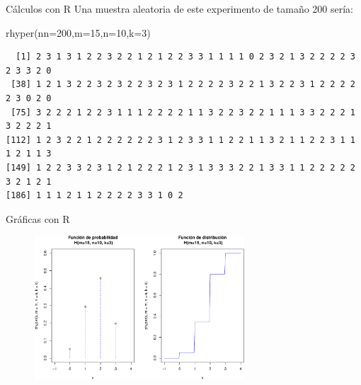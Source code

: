 \documentclass[
  ignorenonframetext,
  aspectratio=169]{beamer}
\newenvironment{Shaded}{\begin{snugshade}}{\end{snugshade}}
\newcommand{\AttributeTok}[1]{\textcolor[rgb]{0.40,0.45,0.13}{#1}}
\newcommand{\DecValTok}[1]{\textcolor[rgb]{0.68,0.00,0.00}{#1}}
\newcommand{\FunctionTok}[1]{\textcolor[rgb]{0.28,0.35,0.67}{#1}}
\newcommand{\NormalTok}[1]{\textcolor[rgb]{0.00,0.23,0.31}{#1}}
\begin{document}
\begin{frame}[fragile]{Cálculos con R}
\protect\hypertarget{cuxe1lculos-con-r-11}{}
Una muestra aleatoria de este experimento de tamaño 200 sería:

\begin{Shaded}
\begin{Highlighting}[]
\FunctionTok{rhyper}\NormalTok{(}\AttributeTok{nn=}\DecValTok{200}\NormalTok{,}\AttributeTok{m=}\DecValTok{15}\NormalTok{,}\AttributeTok{n=}\DecValTok{10}\NormalTok{,}\AttributeTok{k=}\DecValTok{3}\NormalTok{)}
\end{Highlighting}
\end{Shaded}

\begin{verbatim}
  [1] 2 3 1 3 1 2 2 3 2 2 1 2 1 2 2 3 3 1 1 1 1 0 2 3 2 1 3 2 2 2 2 3 2 3 3 2 0
 [38] 1 2 1 3 2 2 3 2 3 2 2 3 2 3 1 2 2 2 2 3 2 2 1 3 2 2 3 1 2 2 2 2 2 3 0 2 0
 [75] 3 2 2 2 1 2 2 3 1 1 1 2 2 2 2 1 1 3 2 2 3 2 2 1 1 1 3 3 2 2 2 1 3 2 2 2 1
[112] 1 2 3 2 2 1 2 2 2 2 2 2 3 1 2 3 3 1 1 2 2 1 1 3 2 1 1 2 2 3 1 1 1 2 1 1 3
[149] 1 2 2 3 3 2 3 1 2 1 2 2 2 1 2 3 1 3 3 3 2 2 1 3 3 1 1 2 2 2 2 2 3 2 1 2 1
[186] 1 1 1 2 1 1 2 2 2 2 3 3 1 0 2
\end{verbatim}
\end{frame}

\begin{frame}{Gráficas con R}
\protect\hypertarget{gruxe1ficas-con-r}{}
\begin{figure}

{\centering \includegraphics[width=0.7\textwidth,height=\textheight]{Tema_3_1_Notables_files/figure-beamer/unnamed-chunk-54-1.pdf}

}

\end{figure}
\end{frame}
\end{document}
